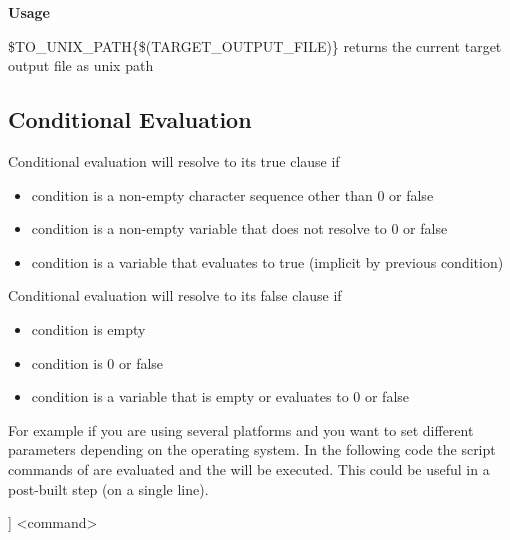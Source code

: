 \textbf{Usage}
\begin{codeentry}
\item[\$TO\_UNIX\_PATH\{\$(TARGET\_OUTPUT\_FILE)\}] returns the current target output file as unix path
\end{codeentry}

\subsection{Conditional Evaluation}


Conditional evaluation will resolve to its true clause if

\begin{itemize}
\item condition is a non-empty character sequence other than 0 or false
\item condition is a non-empty variable that does not resolve to 0 or false
\item condition is a variable that evaluates to true (implicit by previous condition)
\end{itemize}

Conditional evaluation will resolve to its false clause if

\begin{itemize}
\item condition is empty
\item condition is 0 or false
\item condition is a variable that is empty or evaluates to 0 or false
\end{itemize}



For example if you are using several platforms and you want to set different parameters depending on the operating system. In the following code the script commands of \codeline{[[ ]]} are evaluated and the  will be executed. This could be useful in a post-built step (on a single line).

\begin{code}
[[ if (PLATFORM ==  PLATFORM_MSW) { print (_T("cmd /c")); } else
      { print (_T("sh ")); } ]] <command>
\end{code}

